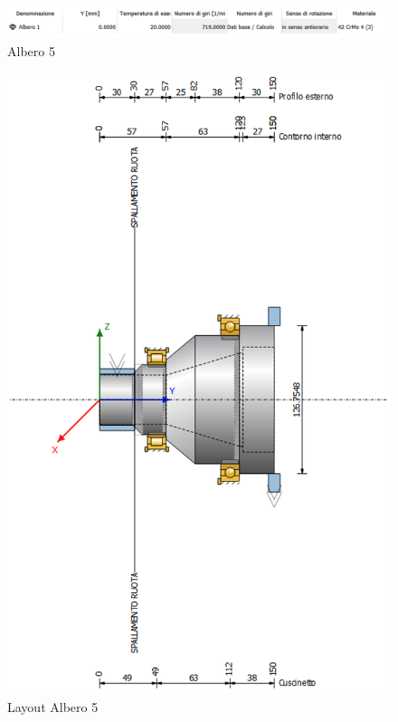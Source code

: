 \begin{figure}[h]
    \centering
    \includegraphics[scale=0.4]{Immagini/DatiAlbero5.png}
    \caption{Albero  5}
    \label{fig:DatiAlbero5}
\end{figure}


\newpage
\begin{figure}[h]
    \centering
    \includegraphics[scale=0.6]{Immagini/Albero5.png}
    \caption{Layout Albero 5}
    \label{fig:Albero5}
\end{figure}
\newpage

